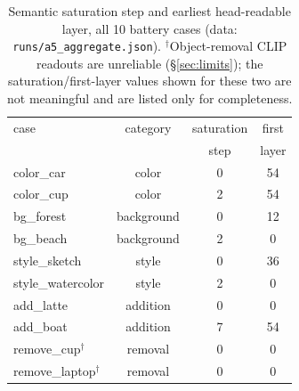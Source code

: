 \documentclass[10pt,twocolumn,letterpaper]{article}
\begin{document}
\begin{table}[t]
\centering
\small
\begin{tabular}{lccc}
\toprule
case & category & saturation & first \\
 & & step & layer \\
\midrule
color\_car        & color         & 0 & 54 \\
color\_cup        & color         & 2 & 54 \\
bg\_forest        & background    & 0 & 12 \\
bg\_beach         & background    & 2 & 0  \\
style\_sketch     & style         & 0 & 36 \\
style\_watercolor & style         & 2 & 0  \\
add\_latte        & addition      & 0 & 0  \\
add\_boat         & addition      & 7 & 54 \\
remove\_cup$^\dagger$      & removal & 0 & 0 \\
remove\_laptop$^\dagger$   & removal & 0 & 0 \\
\bottomrule
\end{tabular}
\caption{Semantic saturation step and earliest head-readable layer, all 10 battery
cases (data: \texttt{runs/a5\_aggregate.json}). $^\dagger$Object-removal
CLIP readouts are unreliable (\S\ref{sec:limits}); the saturation/first-layer
values shown for these two are not meaningful and are listed only for
completeness.}
\label{tab:battery}
\end{table}
\end{document}
